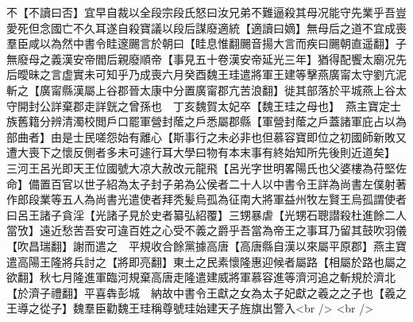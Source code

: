 不【不讀曰否】宜早自裁以全段宗段氏怒曰汝兄弟不難逼殺其母况能守先業乎吾豈愛死但念國亡不久耳遂自殺寶議以段后謀廢適統【適讀曰嫡】無母后之道不宜成喪羣臣咸以為然中書令眭邃颺言於朝曰【眭息惟翻颺音揚大言而疾曰颺朝直遥翻】子無廢母之義漢安帝閻后親廢順帝【事見五十卷漢安帝延光三年】猶得配饗太廟况先后曖昧之言虚實未可知乎乃成喪六月癸酉魏王珪遣將軍王建等擊燕廣甯太守劉亢泥斬之【廣甯縣漢屬上谷郡晉太康中分置廣甯郡亢苦浪翻】徙其部落於平城燕上谷太守開封公詳棄郡走詳皝之曾孫也　丁亥魏賀太妃卒【魏王珪之母也】　燕主寶定士族舊籍分辨清濁校閲戶口罷軍營封䕃之戶悉屬郡縣【軍營封䕃之戶蓋諸軍庇占以為部曲者】由是士民嗟怨始有離心【斯事行之未必非也但慕容寶即位之初國師新敗又遭大喪下之懷反側者多未可遽行耳大學曰物有本末事有終始知所先後則近道矣】　三河王呂光即天王位國號大凉大赦改元龍飛【呂光字世明畧陽氏也父婆樓為苻堅佐命】備置百官以世子紹為太子封子弟為公侯者二十人以中書令王詳為尚書左僕射著作郎段業等五人為尚書光遣使者拜秃髪烏孤為征南大將軍益州牧左賢王烏孤謂使者曰呂王諸子貪淫【光諸子見於史者纂弘紹覆】三甥暴虐【光甥石聰譛殺杜進餘二人當攷】遠近愁苦吾安可違百姓之心受不義之爵乎吾當為帝王之事耳乃留其鼓吹羽儀【吹昌瑞翻】謝而遣之　平規收合餘黨據高唐【高唐縣自漢以來屬平原郡】燕主寶遣高陽王隆將兵討之【將即亮翻】東土之民素懷隆惠迎候者屬路【相屬於路也屬之欲翻】秋七月隆進軍臨河規棄高唐走隆遣建威將軍慕容進等濟河追之斬規於濟北【於濟子禮翻】平喜犇彭城　納故中書令王獻之女為太子妃獻之羲之之子也【羲之王導之從子】魏羣臣勸魏王珪稱尊號珪始建天子旌旗出警入<br />
<br />
